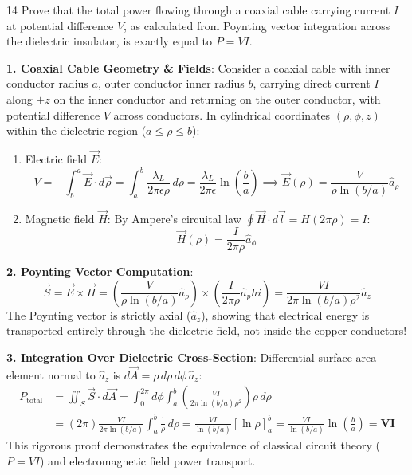 \begin{theoryq}{14}
Prove that the total power flowing through a coaxial cable carrying current $I$ at potential difference $V$, as calculated from Poynting vector integration across the dielectric insulator, is exactly equal to $P = V I$.
\end{theoryq}
\begin{theorysol}
\textbf{1. Coaxial Cable Geometry \& Fields}:
Consider a coaxial cable with inner conductor radius $a$, outer conductor inner radius $b$, carrying direct current $I$ along $+z$ on the inner conductor and returning on the outer conductor, with potential difference $V$ across conductors.
In cylindrical coordinates $(\rho, \phi, z)$ within the dielectric region ($a \le \rho \le b$):
\begin{enumerate}
    \item Electric field $\vec{E}$:
    \begin{equation}
    V = -\int_b^a \vec{E}\cdot d\vec{\rho} = \int_a^b \frac{\lambda_L}{2\pi\epsilon\rho}\,d\rho = \frac{\lambda_L}{2\pi\epsilon}\ln\left(\frac{b}{a}\right) \implies \vec{E}(\rho) = \frac{V}{\rho \ln(b/a)}\hat{a}_\rho
    \end{equation}
    \item Magnetic field $\vec{H}$:
    By Ampere's circuital law $\oint \vec{H}\cdot d\vec{l} = H(2\pi\rho) = I$:
    \begin{equation}
    \vec{H}(\rho) = \frac{I}{2\pi \rho}\hat{a}_\phi
    \end{equation}
\end{enumerate}

\textbf{2. Poynting Vector Computation}:
\begin{equation}
\vec{S} = \vec{E} \times \vec{H} = \left( \frac{V}{\rho \ln(b/a)}\hat{a}_\rho \right) \times \left( \frac{I}{2\pi \rho}\hat{a}_phi \right) = \frac{V I}{2\pi \ln(b/a)\rho^2}\hat{a}_z
\end{equation}
The Poynting vector is strictly axial ($\hat{a}_z$), showing that electrical energy is transported entirely through the dielectric field, not inside the copper conductors!

\textbf{3. Integration Over Dielectric Cross-Section}:
Differential surface area element normal to $\hat{a}_z$ is $d\vec{A} = \rho\,d\rho\,d\phi\,\hat{a}_z$:
\begin{align*}
P_{\text{total}} &= \iint_S \vec{S} \cdot d\vec{A} = \int_0^{2\pi} d\phi \int_a^b \left( \frac{V I}{2\pi \ln(b/a)\rho^2} \right) \rho\,d\rho \\
&= (2\pi) \frac{V I}{2\pi \ln(b/a)} \int_a^b \frac{1}{\rho}\,d\rho = \frac{V I}{\ln(b/a)} \left[ \ln\rho \right]_a^b = \frac{V I}{\ln(b/a)} \ln\left(\frac{b}{a}\right) = \mathbf{V I}
\end{align*}
This rigorous proof demonstrates the equivalence of classical circuit theory ($P = VI$) and electromagnetic field power transport.
\end{theorysol}
\vspace{4mm}

